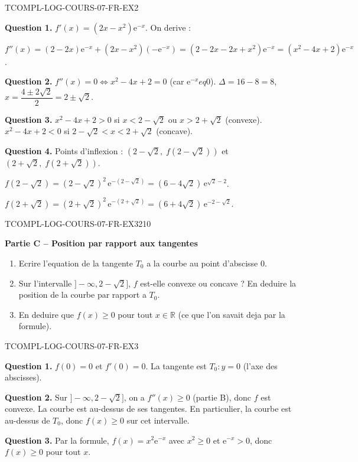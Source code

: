 \begin{corrige}{TCOMPL-LOG-COURS-07-FR-EX2}

\textbf{Question 1.} $f'(x) = (2x - x^2)\mathrm{e}^{-x}$. On derive :

$f''(x) = (2 - 2x)\mathrm{e}^{-x} + (2x - x^2)(-\mathrm{e}^{-x}) = (2 - 2x - 2x + x^2)\mathrm{e}^{-x} = (x^2 - 4x + 2)\mathrm{e}^{-x}$.

\textbf{Question 2.} $f''(x) = 0 \iff x^2 - 4x + 2 = 0$ (car $\mathrm{e}^{-x} 
eq 0$). $\Delta = 16 - 8 = 8$, $x = \dfrac{4 \pm 2\sqrt{2}}{2} = 2 \pm \sqrt{2}$.

\textbf{Question 3.} $x^2 - 4x + 2 > 0$ si $x < 2 - \sqrt{2}$ ou $x > 2 + \sqrt{2}$ (convexe). $x^2 - 4x + 2 < 0$ si $2 - \sqrt{2} < x < 2 + \sqrt{2}$ (concave).

\textbf{Question 4.} Points d'inflexion : $(2 - \sqrt{2},\; f(2-\sqrt{2}))$ et $(2 + \sqrt{2},\; f(2+\sqrt{2}))$.

$f(2-\sqrt{2}) = (2-\sqrt{2})^2\,\mathrm{e}^{-(2-\sqrt{2})} = (6-4\sqrt{2})\,\mathrm{e}^{\sqrt{2}-2}$.

$f(2+\sqrt{2}) = (2+\sqrt{2})^2\,\mathrm{e}^{-(2+\sqrt{2})} = (6+4\sqrt{2})\,\mathrm{e}^{-2-\sqrt{2}}$.

\end{corrige}

\bigskip


\begin{exercice}{TCOMPL-LOG-COURS-07-FR-EX3}{2}{10}

\textbf{Partie C -- Position par rapport aux tangentes}

\begin{enumerate}
  \item Ecrire l'equation de la tangente $T_0$ a la courbe au point d'abscisse $0$.
  \item Sur l'intervalle $]-\infty, 2 - \sqrt{2}]$, $f$ est-elle convexe ou concave ? En deduire la position de la courbe par rapport a $T_0$.
  \item En deduire que $f(x) \geq 0$ pour tout $x \in \mathbb{R}$ (ce que l'on savait deja par la formule).
\end{enumerate}

\end{exercice}

\begin{corrige}{TCOMPL-LOG-COURS-07-FR-EX3}

\textbf{Question 1.} $f(0) = 0$ et $f'(0) = 0$. La tangente est $T_0 : y = 0$ (l'axe des abscisses).

\textbf{Question 2.} Sur $]-\infty, 2 - \sqrt{2}]$, on a $f''(x) \geq 0$ (partie B), donc $f$ est convexe. La courbe est au-dessus de ses tangentes. En particulier, la courbe est au-dessus de $T_0$, donc $f(x) \geq 0$ sur cet intervalle.

\textbf{Question 3.} Par la formule, $f(x) = x^2 \mathrm{e}^{-x}$ avec $x^2 \geq 0$ et $\mathrm{e}^{-x} > 0$, donc $f(x) \geq 0$ pour tout $x$.

\end{corrige}
